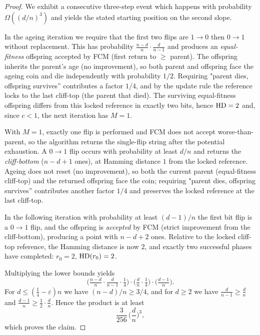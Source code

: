 \begin{proof}
	We exhibit a consecutive three-step event which happens with probability $\Omega((d/n)^3)$ and yields the stated starting 
	position on the second slope.
	
	 In the ageing iteration we require that the first two flips are $1\!\to 0$ then $0\!\to 1$ without replacement. This has probability $\frac{n-d}{n}\cdot\frac{d}{n-1}$ and produces an \emph{equal-fitness} offspring accepted by FCM (first return to $\ge$ parent). The offspring inherits the parent's age (no improvement), so both parent and offspring face the ageing coin and die independently with probability $1/2$. Requiring "parent dies, offspring survives'' contributes a factor $1/4$, and by the update rule the reference locks to the last cliff-top (the parent that died). The surviving equal-fitness offspring differs from this locked reference in exactly two bits, hence $\text{HD}=2$ and, since $c<1$, the next iteration has $M=1$.
		
 With $M=1$, exactly one flip is performed and FCM does not accept worse-than-parent, so the algorithm returns the single-flip string after the potential exhaustion. A $0\!\to 1$ flip occurs with probability at least $d/n$ and returns the \emph{cliff-bottom} ($n-d+1$ ones), at Hamming distance $1$ from the locked reference. Ageing does not reset (no improvement), so both the current parent (equal-fitness cliff-top) and the returned offspring face the coin; requiring "parent dies, offspring survives'' contributes another factor $1/4$ and preserves the locked reference at the last cliff-top.
	
 In the following iteration with probability at least $(d-1)/n$ the first bit flip is a $0\!\to 1$ flip, and the offspring is \emph{accepted} by FCM (strict improvement from the cliff-bottom), producing a point with $n-d+2$ ones. Relative to the locked cliff-top reference, the Hamming distance is now $2$, and exactly two successful phases have completed: $r_0=2$, $\text{HD}(r_0)=2$.
	
	Multiplying the lower bounds yields
	\[
	\Big(\tfrac{n-d}{n}\cdot\tfrac{d}{n-1}\cdot\tfrac14\Big)\cdot
	\Big(\tfrac{d}{n}\cdot\tfrac14\Big)\cdot
	\Big(\tfrac{d-1}{n}\Big).
	\]
	For $d\le(\tfrac14-\varepsilon)n$ we have $(n-d)/n\ge 3/4$, and for $d\ge 2$ we have $\tfrac{d}{n-1}\ge\tfrac{d}{n}$ and $\tfrac{d-1}{n}\ge \tfrac12\cdot\tfrac{d}{n}$. Hence the product is at least
	\[
	\frac{3}{256}\,\Big(\frac{d}{n}\Big)^{\!3},
	\]
	which proves the claim.
\end{proof}

